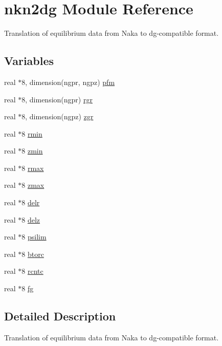 \hypertarget{namespacenkn2dg}{
\section{nkn2dg Module Reference}
\label{namespacenkn2dg}
}
Translation of equilibrium data from Naka to dg-compatible format.  


\subsection*{Variables}
\begin{CompactItemize}
\item 
real $\ast$8, dimension(ngpr, ngpz) \hyperlink{namespacenkn2dg_cac07d272bf378866d1d4a0f5dc0db7a}{pfm}
\item 
real $\ast$8, dimension(ngpr) \hyperlink{namespacenkn2dg_0ec68e915a42a04daca06d6dbbf940c2}{rgr}
\item 
real $\ast$8, dimension(ngpz) \hyperlink{namespacenkn2dg_0c40a3d27386ecf84f131294ff888421}{zgr}
\item 
real $\ast$8 \hyperlink{namespacenkn2dg_ff6da305fb08058f838a59caa1a250ee}{rmin}
\item 
real $\ast$8 \hyperlink{namespacenkn2dg_149c8541a12c707978582512a081c137}{zmin}
\item 
real $\ast$8 \hyperlink{namespacenkn2dg_b5ad0e96c0a62c643cd273561f582713}{rmax}
\item 
real $\ast$8 \hyperlink{namespacenkn2dg_94fb3ed033f384d20c9e79216d6c94c4}{zmax}
\item 
real $\ast$8 \hyperlink{namespacenkn2dg_1aaa2e2804a7843d98344bc63f5bea89}{delr}
\item 
real $\ast$8 \hyperlink{namespacenkn2dg_3b404dd21c77dcd73a517b55e31d1de1}{delz}
\item 
real $\ast$8 \hyperlink{namespacenkn2dg_4ab91cc0041ca344c9f72ed4109c6bbd}{psilim}
\item 
real $\ast$8 \hyperlink{namespacenkn2dg_76a10b481175bae7917e5c0e19c198ee}{btorc}
\item 
real $\ast$8 \hyperlink{namespacenkn2dg_ab7476f8d5f0b306f5873a3e62b9d84a}{rcntc}
\item 
real $\ast$8 \hyperlink{namespacenkn2dg_f6426e5fc87f2e775e2e9f5d6efe3ddb}{fg}
\end{CompactItemize}


\subsection{Detailed Description}
Translation of equilibrium data from Naka to dg-compatible format. 

